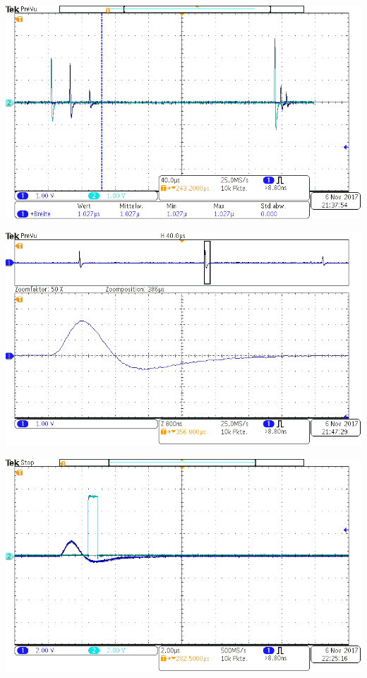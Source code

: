 \begin{center}
    \begin{adjustbox}{max width=\linewidth, keepaspectratio}
        \includegraphics[]{png/tek00003}
    \end{adjustbox}
    \label{fig:}
\end{center}
%
\begin{center}
    \begin{adjustbox}{max width=\linewidth, keepaspectratio}
        \includegraphics[]{png/tek00004}
    \end{adjustbox}
    \label{fig:}
\end{center}
%
\begin{center}
    \begin{adjustbox}{max width=\linewidth, keepaspectratio}
        \includegraphics[]{png/tek00006}
    \end{adjustbox}
    \label{fig:}
\end{center}
